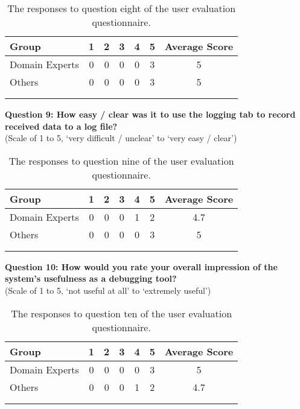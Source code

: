 \begin{longtable}{ l c c c c c c }
 \textbf{Group} & \textbf{1} & \textbf{2} & \textbf{3} & \textbf{4} & \textbf{5} & \textbf{Average Score} \\ 
 \hline
 Domain Experts & 0 & 0 & 0 & 0 & 3 & 5 \\
 Others 		& 0 & 0 & 0 & 0 & 3 & 5 \\
 \bottomrule
\caption[User Evaluation Question 8 Responses]{The responses to question eight of the user evaluation questionnaire.}\\
\label{tab:EvaluationQuestionEight}
\end{longtable}

\noindent\textbf{Question 9: How easy / clear was it to use the logging tab to record received data to a log file?}\\(Scale of 1 to 5, `very difficult / unclear' to `very easy / clear')

\begin{longtable}{ l c c c c c c }
 \textbf{Group} & \textbf{1} & \textbf{2} & \textbf{3} & \textbf{4} & \textbf{5} & \textbf{Average Score} \\ 
 \hline
 Domain Experts & 0 & 0 & 0 & 1 & 2 & 4.7 \\
 Others 		& 0 & 0 & 0 & 0 & 3 & 5 \\
 \bottomrule
\caption[User Evaluation Question 9 Responses]{The responses to question nine of the user evaluation questionnaire.}\\
\label{tab:EvaluationQuestionNine}
\end{longtable}

\noindent\textbf{Question 10: How would you rate your overall impression of the system's usefulness as a debugging tool?}\\(Scale of 1 to 5, `not useful at all' to `extremely useful')

\begin{longtable}{ l c c c c c c }
 \textbf{Group} & \textbf{1} & \textbf{2} & \textbf{3} & \textbf{4} & \textbf{5} & \textbf{Average Score} \\ 
 \hline
 Domain Experts & 0 & 0 & 0 & 0 & 3 & 5 \\
 Others 		& 0 & 0 & 0 & 1 & 2 & 4.7 \\
 \bottomrule
\caption[User Evaluation Question 10 Responses]{The responses to question ten of the user evaluation questionnaire.}\\
\label{tab:EvaluationQuestionTen}
\end{longtable}


